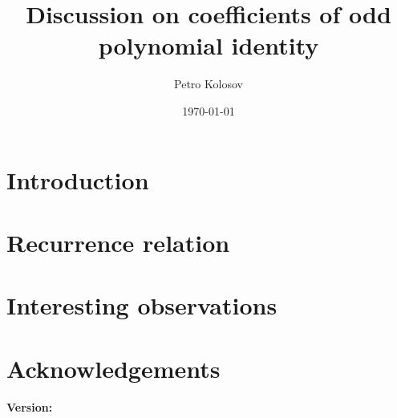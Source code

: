 \documentclass[12pt,letterpaper,oneside,reqno]{amsart}
\title[Discussion on coefficients of odd polynomial identity]
{Discussion on coefficients of odd polynomial identity}
\author[Petro Kolosov]{Petro Kolosov}
\date{\today}
\begin{document}
    \begin{abstract}
        
    \end{abstract}

    \maketitle


    \section{Introduction}\label{sec:introduction}
    


    \section{Recurrence relation}\label{sec:recurrence-relation}
    


    \section{Interesting observations}\label{sec:interesting-observations}
    


    \section{Acknowledgements}\label{sec:acknowledgements}
    

    
    
    \noindent \textbf{Version:} 
\end{document}
